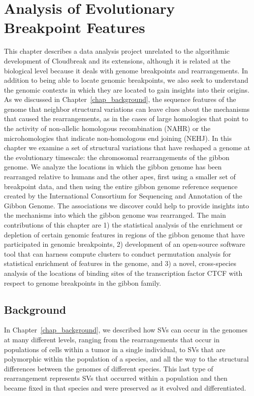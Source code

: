 \chapter{Analysis of Evolutionary Breakpoint Features}
\label{chap_breakpoint_analysis}

This chapter describes a data analysis project unrelated to the algorithmic development of Cloudbreak and its extensions, although it is related at the biological level because it deals with genome breakpoints and rearrangements. In addition to being able to locate genomic breakpoints, we also seek to understand the genomic contexts in which they are located to gain insights into their origins. As we discussed in Chapter~\ref{chap_background}, the sequence features of the genome that neighbor structural variations can leave clues about the mechanisms that caused the rearrangements, as in the cases of large homologies that point to the activity of non-allelic homologous recombination (NAHR) or the microhomologies that indicate non-homologous end joining (NEHJ). In this chapter we examine a set of structural variations that have reshaped a genome at the evolutionary timescale: the chromosomal rearrangements of the gibbon genome. We analyze the locations in which the gibbon genome has been rearranged relative to humans and the other apes, first using a smaller set of breakpoint data, and then using the entire gibbon genome reference sequence created by the International Consortium for Sequencing and Annotation of the Gibbon Genome. The associations we discover could help to provide insights into the mechanisms into which the gibbon genome was rearranged.  The main contributions of this chapter are 1) the statistical analysis of the enrichment or depletion of certain genomic features in regions of the gibbon genome that have participated in genomic breakpoints, 2) development of an open-source software tool that can harness compute clusters to conduct permutation analysis for statistical enrichment of features in the genome, and 3) a novel, cross-species analysis of the locations of binding sites of the transcription factor CTCF with respect to genome breakpoints in the gibbon family.

\section{Background}

In Chapter~\ref{chap_background}, we described how SVs can occur in the genomes at many different levels, ranging from the rearrangements that occur in populations of cells within a tumor in a single individual, to SVs that are polymorphic within the population of a species, and all the way to the structural differences between the genomes of different species. This last type of rearrangement represents SVs that occurred within a population and then became fixed in that species and were preserved as it evolved and differentiated. 

